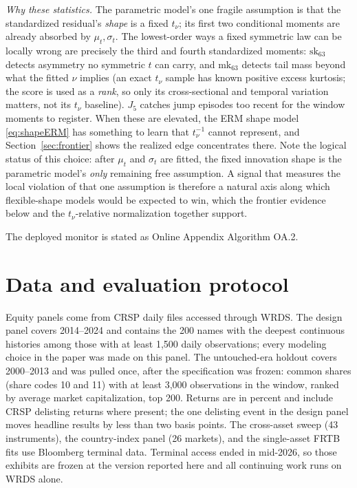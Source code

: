 \documentclass[11pt]{article}
\theoremstyle{remark}
\begin{document}
\emph{Why these statistics.} The parametric model's one fragile
assumption is that the standardized residual's \emph{shape} is a fixed
$t_\nu$; its first two conditional moments are already absorbed by
$\mu_t, \sigma_t$. The lowest-order ways a fixed symmetric law can be
locally wrong are precisely the third and fourth standardized moments:
$\mathrm{sk}_{63}$ detects asymmetry no symmetric $t$ can carry, and
$\mathrm{mk}_{63}$ detects tail mass beyond what the fitted $\nu$
implies (an exact $t_\nu$ sample has known positive excess kurtosis;
the score is used as a \emph{rank}, so only its cross-sectional and
temporal variation matters, not its $t_\nu$ baseline). $J_5$ catches
jump episodes too recent for the window moments to register. When these
are elevated, the ERM shape model \eqref{eq:shapeERM} has something to
learn that $t_\nu^{-1}$ cannot represent, and Section~\ref{sec:frontier} shows the realized edge concentrates there. Note the logical
status of this choice: after $\mu_t$ and $\sigma_t$ are fitted, the
fixed innovation shape is the parametric model's \emph{only} remaining
free assumption. A signal that measures the local violation of that
one assumption is therefore a natural axis along which flexible-shape
models would be expected to win, which the frontier evidence below
and the $t_\nu$-relative normalization together support.

\noindent The deployed monitor is stated as Online Appendix Algorithm OA.2.

\section{Data and evaluation protocol}\label{sec:protocol}

Equity panels come from CRSP daily files accessed through WRDS. The
design panel covers 2014--2024 and contains the 200 names with the
deepest continuous histories among those with at least 1{,}500 daily
observations; every modeling choice in the paper was made on this
panel. The untouched-era holdout covers 2000--2013 and was pulled once,
after the specification was frozen: common shares (share codes 10 and
11) with at least 3{,}000 observations in the window, ranked by average
market capitalization, top 200. Returns are in percent and include
CRSP delisting returns where present; the one delisting event in the
design panel moves headline results by less than two basis points. The
cross-asset sweep (43 instruments), the country-index panel (26
markets), and the single-asset FRTB fits use Bloomberg terminal data.
Terminal access ended in mid-2026, so those exhibits are frozen at the
version reported here and all continuing work runs on WRDS alone.
\end{document}
